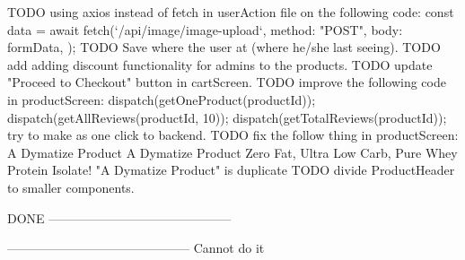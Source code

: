 TODO  using axios instead of fetch in userAction file on the following code: 
       const data = await fetch(`/api/image/image-upload`, {
      method: "POST",
      body: formData,
    });
TODO  Save where the user at (where he/she last seeing).
TODO  add adding discount functionality for admins to the products.
TODO  update "Proceed to Checkout" button in cartScreen.
TODO improve the following code in productScreen:
dispatch(getOneProduct(productId));
dispatch(getAllReviews(productId, 10));
dispatch(getTotalReviews(productId));
try to make as one click to backend.
TODO  fix the follow thing in productScreen:
A Dymatize Product
A Dymatize Product Zero Fat, Ultra Low Carb, Pure Whey Protein Isolate!
"A Dymatize Product" is duplicate
TODO divide ProductHeader to smaller components.


DONE
--------------------------------------------



--------------------------------------------
Cannot do it
